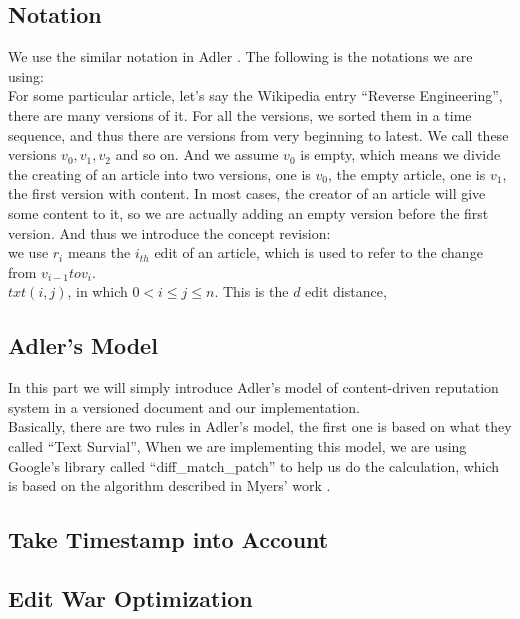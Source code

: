 \documentclass[preprint,review,12pt]{elsarticle}
\begin{document}
\subsection{Notation}
We use the similar notation in Adler \cite{adler2007content}. The following is
the notations we are using:\\
For some particular article, let's say the Wikipedia entry ``Reverse
Engineering'', there are many versions of it.
For all the versions, we sorted them in a time sequence, and thus there are
versions from very beginning to latest. We call these versions $v_0, v_1, v_2$
and so on. And we assume $v_0$ is empty, which means we divide the creating of
an article into two versions, one is $v_0$, the empty article, one is $v_1$, the
first version with content. In most cases, the creator of an article will give
some content to it, so we are actually adding an empty version before the first
version. And thus we introduce the concept revision:\\
we use $r_i$ means the $i_{th}$ edit of an article, which is used to refer to
the change from $v_{i-1} to v_i$.\\
$txt(i,j)$, in which $0 < i \leq j \leq n$. This is the 
$d$ edit distance, 

\subsection{Adler's Model}
In this part we will simply introduce Adler's model of content-driven reputation
system in a versioned document and our implementation.\\
Basically, there are two rules in Adler's model, the first one is based on what
they called ``Text Survial'', 
When we are implementing this model, we are using Google's library called
``diff\_match\_patch'' to help us do the calculation, which is based on the
algorithm described in Myers' work \cite{myers1986ano}.

\subsection{Take Timestamp into Account}

\subsection{Edit War Optimization}
\end{document}
